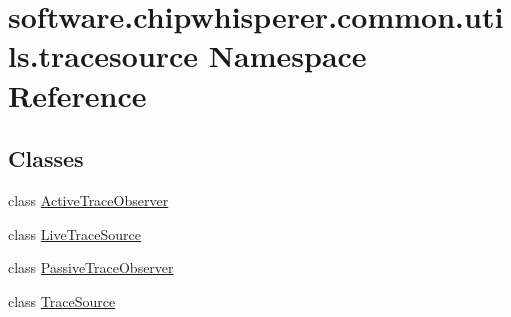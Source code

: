 \hypertarget{namespacesoftware_1_1chipwhisperer_1_1common_1_1utils_1_1tracesource}{}\section{software.\+chipwhisperer.\+common.\+utils.\+tracesource Namespace Reference}
\label{namespacesoftware_1_1chipwhisperer_1_1common_1_1utils_1_1tracesource}
\subsection*{Classes}
\begin{DoxyCompactItemize}
\item 
class \hyperlink{classsoftware_1_1chipwhisperer_1_1common_1_1utils_1_1tracesource_1_1ActiveTraceObserver}{Active\+Trace\+Observer}
\item 
class \hyperlink{classsoftware_1_1chipwhisperer_1_1common_1_1utils_1_1tracesource_1_1LiveTraceSource}{Live\+Trace\+Source}
\item 
class \hyperlink{classsoftware_1_1chipwhisperer_1_1common_1_1utils_1_1tracesource_1_1PassiveTraceObserver}{Passive\+Trace\+Observer}
\item 
class \hyperlink{classsoftware_1_1chipwhisperer_1_1common_1_1utils_1_1tracesource_1_1TraceSource}{Trace\+Source}
\end{DoxyCompactItemize}
